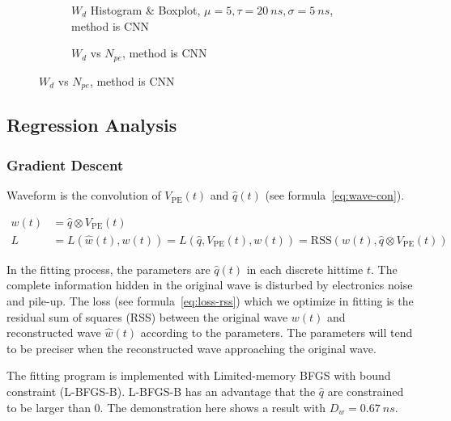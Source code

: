 \begin{figure}[H]
\begin{minipage}[t]{.5\textwidth}
\begin{figure}[H]
    \centering
    \resizebox{\textwidth}{!}{}
    \caption{\label{fig:cnn-hist} $W_{d}$ Histogram \& Boxplot, $\mu=5, \tau=\SI{20}{ns}, \sigma=\SI{5}{ns}$, method is CNN}
\end{figure}
\end{minipage}
\begin{minipage}[t]{.5\textwidth}
\begin{figure}[H]
    \centering
    \resizebox{\textwidth}{!}{}
    \caption{\label{fig:cnn-npe} $W_{d}$ vs $N_{pe}$, method is CNN}
\end{figure}
\end{minipage}
\end{figure}

\subsection{Regression Analysis}
\subsubsection{Gradient Descent}

Waveform is the convolution of $V_\mathrm{PE}(t)$ and $\hat{q}(t)$ (see formula~\eqref{eq:wave-con}). 

\begin{align}
    w(t) &= \hat{q} \otimes V_\mathrm{PE}(t) \label{eq:wave-con} \\
    L &= L(\hat{w}(t), w(t)) = L(\hat{q}, V_\mathrm{PE}(t), w(t)) = \mathrm{RSS}(w(t), \hat{q} \otimes V_\mathrm{PE}(t)) \label{eq:loss-rss}
\end{align}

In the fitting process, the parameters are $\hat{q}(t)$ in each discrete hittime $t$. The complete information hidden in the original wave is disturbed by electronics noise and pile-up. The loss (see formula~\ref{eq:loss-rss}) which we optimize in fitting is the residual sum of squares (RSS) between the original wave $w(t)$ and reconstructed wave $\hat{w}(t)$ according to the parameters. The parameters will tend to be preciser when the reconstructed wave approaching the original wave. 

The fitting program is implemented with Limited-memory BFGS with bound constraint \cite{byrd_limited_1995} (L-BFGS-B). L-BFGS-B has an advantage that the $\hat{q}$ are constrained to be larger than 0. The demonstration here shows a result with $D_w = \SI{0.67}{ns}$.

